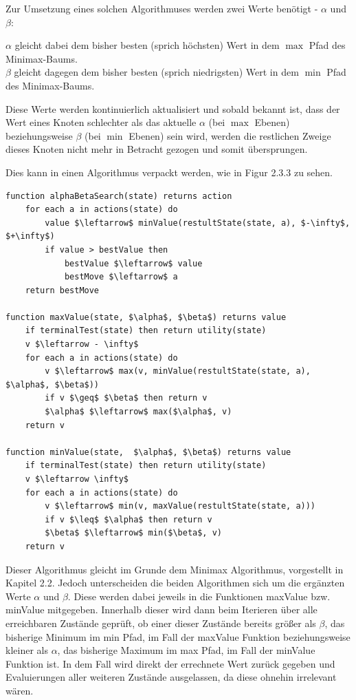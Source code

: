 Zur Umsetzung eines solchen Algorithmuses werden zwei Werte benötigt - $\alpha$ und $\beta$:

$\alpha$ gleicht dabei dem bisher besten (sprich höchsten) Wert in dem $\max$ Pfad des Minimax-Baums.\\
$\beta$ gleicht dagegen dem bisher besten (sprich niedrigsten) Wert in dem $\min$ Pfad des Minimax-Baums.

Diese Werte werden kontinuierlich aktualisiert und sobald bekannt ist, dass der Wert eines Knoten schlechter als das aktuelle $\alpha$ (bei $\max$ Ebenen) beziehungsweise $\beta$ (bei $\min$ Ebenen) sein wird, werden die restlichen Zweige dieses Knoten nicht mehr in Betracht gezogen und somit übersprungen.

Dies kann in einen Algorithmus verpackt werden, wie in Figur 2.3.3 zu sehen.

\begin{lstlisting}[mathescape]
function alphaBetaSearch(state) returns action
	for each a in actions(state) do
		value $\leftarrow$ minValue(restultState(state, a), $-\infty$, $+\infty$)
		if value > bestValue then
			bestValue $\leftarrow$ value
			bestMove $\leftarrow$ a
	return bestMove
	
function maxValue(state, $\alpha$, $\beta$) returns value
	if terminalTest(state) then return utility(state)
	v $\leftarrow - \infty$
	for each a in actions(state) do
		v $\leftarrow$ max(v, minValue(restultState(state, a), $\alpha$, $\beta$))
		if v $\geq$ $\beta$ then return v
		$\alpha$ $\leftarrow$ max($\alpha$, v)
	return v
	
function minValue(state,  $\alpha$, $\beta$) returns value
	if terminalTest(state) then return utility(state)
	v $\leftarrow \infty$
	for each a in actions(state) do
		v $\leftarrow$ min(v, maxValue(restultState(state, a)))
		if v $\leq$ $\alpha$ then return v
		$\beta$ $\leftarrow$ min($\beta$, v)
	return v
\end{lstlisting}

Dieser Algorithmus gleicht im Grunde dem Minimax Algorithmus, vorgestellt in Kapitel 2.2. Jedoch unterscheiden die beiden Algorithmen sich um die ergänzten Werte $\alpha$ und $\beta$. Diese werden dabei jeweils in die Funktionen maxValue bzw. minValue mitgegeben. Innerhalb dieser wird dann beim Iterieren über alle erreichbaren Zustände geprüft, ob einer dieser Zustände bereits größer als $\beta$, das bisherige Minimum im min Pfad, im Fall der maxValue Funktion beziehungsweise kleiner als $\alpha$, das bisherige Maximum im max Pfad, im Fall der minValue Funktion ist. In dem Fall wird direkt der errechnete Wert zurück gegeben und Evaluierungen aller weiteren Zustände ausgelassen, da diese ohnehin irrelevant wären.

